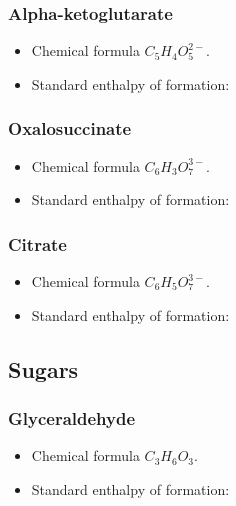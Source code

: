 \documentclass{article}
\begin{document}
\subsubsection{Alpha-ketoglutarate}
\begin{itemize}
    \item Chemical formula $C_5H_4O_5^{2-}$.
    \item Standard enthalpy of formation:
\end{itemize}

\subsubsection{Oxalosuccinate}
\begin{itemize}
    \item Chemical formula $C_6H_3O_7^{3-}$.
    \item Standard enthalpy of formation:
\end{itemize}

\subsubsection{Citrate}
\begin{itemize}
    \item Chemical formula $C_6H_5O_7^{3-}$.
    \item Standard enthalpy of formation:
\end{itemize}

\subsection{Sugars}

\subsubsection{Glyceraldehyde}
\begin{itemize}
    \item Chemical formula $C_3H_6O_3$.
    \item Standard enthalpy of formation:
\end{itemize}
\end{document}
